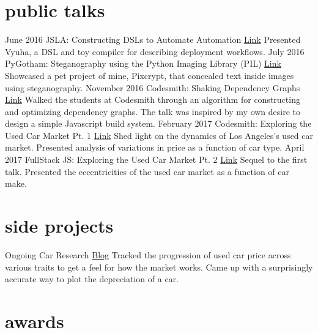 \documentclass[]{friggeri-cv}
\begin{document}
\section{public talks}

\begin{entrylist}
  \entry
    {June 2016}
    {JSLA: Constructing DSLs to Automate Automation}
    {\href{https://www.youtube.com/watch?v=qcF3omniwtY}{Link}}
    {Presented Vyuha, a DSL and toy compiler for describing deployment workflows.}
  \entry
    {July 2016}
    {PyGotham: Steganography using the Python Imaging Library (PIL)}
    {\href{https://goo.gl/wXvnT4/The_Colors_Duke_Steganography_using_the_Python_Imaging_Library_PIL.png}{Link}}
    {Showcased a pet project of mine, Pixcrypt, that concealed text inside images using steganography.}
  \entry
    {November 2016}
    {Codesmith: Shaking Dependency Graphs}
    {\href{}{Link}}
    {Walked the students at Codesmith through an algorithm for constructing and optimizing dependency graphs. The talk was inspired by my own desire to design a simple Javascript build system.}
  \entry
    {February 2017}
    {Codesmith: Exploring the Used Car Market Pt. 1}
    {\href{}{Link}}
    {Shed light on the dynamics of Los Angeles's used car market. Presented analysis of variations in price as a function of car type.}
  \entry
    {April 2017}
    {FullStack JS: Exploring the Used Car Market Pt. 2}
    {\href{https://www.meetup.com/SoCal-Full-Stack-JS/events/238047650/}{Link}}
    {Sequel to the first talk. Presented the eccentricities of the used car market as a function of car make.}
\end{entrylist}

\pagebreak

\section{side projects}

\begin{entrylist}

  \entry
    {Ongoing}
    {Car Research}
    {\href{}{Blog}}
    {Tracked the progression of used car price across various traits to get a feel for how the market works. Came up with a surprisingly accurate way to plot the depreciation of a car.}

\end{entrylist}

\section{awards}
\end{document}
